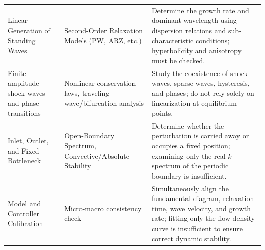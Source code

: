 \documentclass[11pt,a4paper,openany]{book}
\numberwithin{equation}{chapter}
\numberwithin{figure}{chapter}
\numberwithin{table}{chapter}
\begin{document}
\begin{center}
\begin{tabular}{p{3.0cm}p{4.1cm}p{6.8cm}}
Linear Generation of Standing Waves




&




Second-Order Relaxation Models (PW, ARZ, etc.)




&




 Determine the growth rate and dominant wavelength using dispersion relations and sub-characteristic conditions; hyperbolicity and anisotropy must be checked.



\\







Finite-amplitude shock waves and phase transitions




&




 Nonlinear conservation laws, traveling wave/bifurcation analysis




&




Study the coexistence of shock waves, sparse waves, hysteresis, and phases; do not rely solely on linearization at equilibrium points.



\\







Inlet, Outlet, and Fixed Bottleneck& Open-Boundary Spectrum, Convective/Absolute Stability




&




Determine whether the perturbation is carried away or occupies a fixed position; examining only the real $k$ spectrum of the periodic boundary is insufficient.



\\







Model and Controller Calibration




&




 Micro-macro consistency check




&




 Simultaneously align the fundamental diagram, relaxation time, wave velocity, and growth rate; fitting only the flow-density curve is insufficient to ensure correct dynamic stability.



\\
\bottomrule
\end{tabular}
\end{center}
\end{document}
